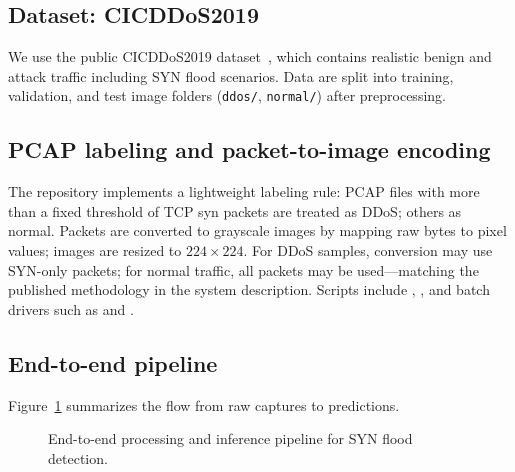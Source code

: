\subsection{Dataset: CICDDoS2019}
We use the public CICDDoS2019 dataset~\cite{cic2019ddos}, which contains
realistic benign and attack traffic including SYN flood scenarios. Data are
split into training, validation, and test image folders (\texttt{ddos/},
\texttt{normal/}) after preprocessing.

\subsection{PCAP labeling and packet-to-image encoding}
The repository implements a lightweight labeling rule: PCAP files with more
than a fixed threshold of TCP \gls{syn} packets are treated as DDoS; others as
normal. Packets are converted to grayscale images by mapping raw bytes to pixel
values; images are resized to $224 \times 224$. For DDoS samples, conversion may
use SYN-only packets; for normal traffic, all packets may be used---matching the
published methodology in the system description. Scripts include
, , and batch drivers
such as  and
.

\subsection{End-to-end pipeline}
Figure~\ref{fig:pipeline} summarizes the flow from raw captures to predictions.

\begin{figure}[htbp]
  \centering
  \caption{End-to-end processing and inference pipeline for SYN flood detection.}
  \label{fig:pipeline}
\end{figure}

